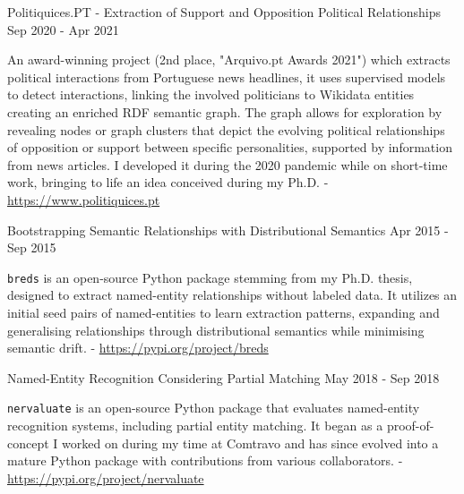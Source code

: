 

\begin{cventries}
  \cvproject
    {Politiquices.PT - Extraction of Support and Opposition Political Relationships} %
	{} %
    {} %
    {Sep 2020 - Apr 2021} %
    {
      \begin{cvitems} %
		  \item{An award-winning project (2nd place, "Arquivo.pt Awards 2021") which extracts political interactions from Portuguese news headlines, it uses supervised models to detect interactions, linking the involved politicians to Wikidata entities creating an enriched RDF semantic graph. The graph allows for exploration by revealing nodes or graph clusters that depict the evolving political relationships of opposition or support between specific personalities, supported by information from news articles. I developed it during the 2020 pandemic while on short-time work, bringing to life an idea conceived during my Ph.D. - \url{https://www.politiquices.pt}}
      \end{cvitems}
    }
\end{cventries}




\begin{cventries}
 \cvproject
   {Bootstrapping Semantic Relationships with Distributional Semantics} %
   {} %
   {} %
   {Apr 2015 - Sep 2015} %
   {
     \begin{cvitems} %
		\item {\texttt{breds} is an open-source Python package stemming from my Ph.D. thesis, designed to extract named-entity relationships without labeled data. It utilizes an initial seed pairs of named-entities to learn extraction patterns, expanding and generalising relationships through distributional semantics while minimising semantic drift. - \url{https://pypi.org/project/breds}}
     \end{cvitems}
   }
\end{cventries}

\begin{cventries}
 \cvproject
   {Named-Entity Recognition Considering Partial Matching} %
   {} %
   {} %
   {May 2018 - Sep 2018} %
   {
     \begin{cvitems} %
     	\item {\texttt{nervaluate} is an open-source Python package that evaluates named-entity recognition systems, including partial entity matching. It began as a proof-of-concept I worked on during my time at Comtravo and has since evolved into a mature Python package with contributions from various collaborators. - \url{https://pypi.org/project/nervaluate}}
     \end{cvitems}
   }
\end{cventries}
